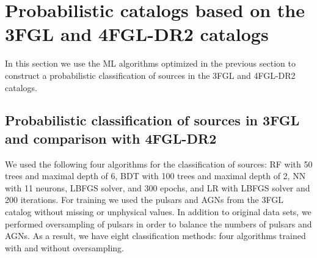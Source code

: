 \documentclass[referee]{aa} %
\newcommand{\lb}{\label}
\begin{document}
\section{Probabilistic catalogs based on the 3FGL and 4FGL-DR2 catalogs}
\lb{sec:prob_cats}

In this section we use the ML algorithms optimized in the previous section to construct a probabilistic
classification of sources in the 3FGL and 4FGL-DR2 catalogs.



\subsection{Probabilistic classification of sources in 3FGL and comparison with 4FGL-DR2}
\lb{sec:3FGLprediction1}


We used the following four algorithms for the classification of sources: RF with 50 trees and maximal depth of 6, BDT with 100 trees and maximal depth of 2, NN with 11 neurons, LBFGS solver, and 300 epochs, and LR with LBFGS solver and 200 iterations. 
For training we used the pulsars and AGNs from the 3FGL catalog without missing or unphysical values. 
In addition to original data sets, we performed oversampling of pulsars in order to balance the numbers of pulsars and AGNs.
As a result, we have eight classification methods: four algorithms trained with and without oversampling.
\end{document}
